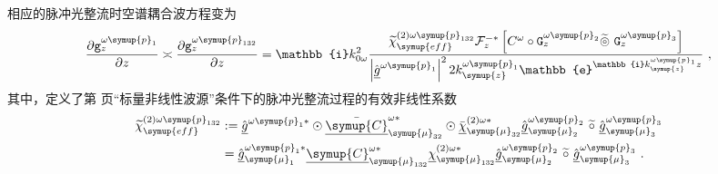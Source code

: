 相应的脉冲光整流时空谱耦合波方程变为
\begin{equation} \label{eq:2-205}
	\abovedisplayskip=13pt
	\belowdisplayskip=13pt
	\displaystyle{\frac{\partial {\mathtt{g}}^{\omega\symup{p}_{1}}_{z}}{\partial z}} \asymp \displaystyle{\frac{\partial {\mathtt{g}}^{\omega\symup{p}_{132}}_{z}}{\partial z}} = \mathbb{i} k^{2}_{0\omega} \frac{ \widetilde{\chi}^{(2)\omega\symup{p}_{132}}_{\symup{eff}} \mathcal F^{-*}_{z} \left[ C^{\omega} \circ {\mathtt{G}}^{\omega{\symup{p}}_{2}}_{z} \widetilde \circledcirc\ {\mathtt{G}}^{\omega{\symup{p}}_{3}}_{z} \right] }{ \left| \hat{\underline{g}}^{\omega\symup{p}_{1}} \right|^2 2 k^{\omega\symup{p}_{1}}_{\symup{z}} \mathbb{e}^{\mathbb{i} k^{\omega\symup{p}_{1}}_{\symup{z}} z} } ~,
\end{equation}
其中，定义了第 \pageref{con:3} 页“标量非线性波源”条件下的脉冲光整流过程的有效非线性系数
\begin{subequations} \label{eq:2-206}
	\abovedisplayskip=13pt
	\belowdisplayskip=13pt
	\begin{align}
		\widetilde{\chi}^{(2)\omega\symup{p}_{132}}_{\symup{eff}} &:= \hat{\underline{g}}^{\omega\symup{p}_{1}*} \odot \bar{\underline{\symup{C}}}^{\omega*}_{{\symup{\mu}}_{32}} \odot \bar{\underline{\chi}}^{(2)\omega*}_{{\symup{\mu}}_{32}} \hat{\underline{g}}^{\omega{\symup{p}}_{2}}_{{\symup{\mu}}_2}\ \widetilde \circ\ \hat{\underline{g}}^{\omega{\symup{p}}_{3}}_{{\symup{\mu}}_3} \label{eq:2-206a} \\ &= \hat{\underline{g}}^{\omega\symup{p}_{1}*}_{{\symup{\mu}}_{1}} \underline{\symup{C}}^{\omega*}_{{\symup{\mu}}_{132}} \underline{\chi}^{(2)\omega*}_{{\symup{\mu}}_{132}} \hat{\underline{g}}^{\omega\symup{p}_{2}}_{{\symup{\mu}}_2} \ \widetilde \circ\ \hat{\underline{g}}^{\omega\symup{p}_{3}}_{{\symup{\mu}}_3} \label{eq:2-206b}~.
	\end{align}
\end{subequations}

